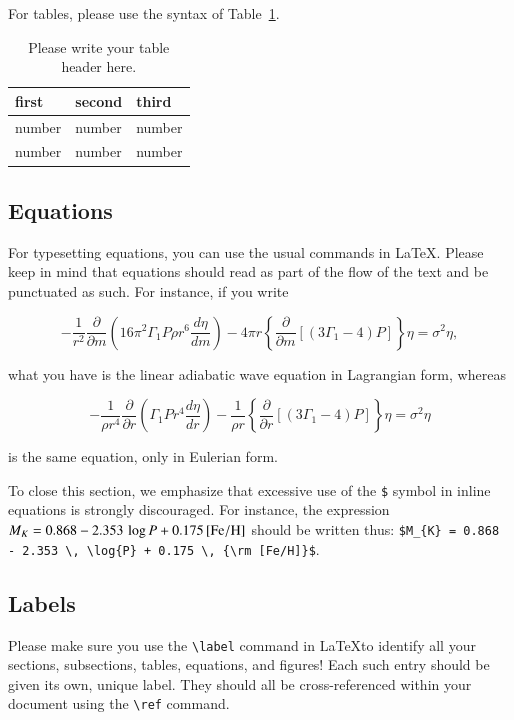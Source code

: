 \documentclass{webofc}
\begin{document}
For tables, please use the syntax of Table~\ref{tab:tab-1}.

\begin{table}
\centering
\caption{Please write your table header here.}
\begin{tabular}{lll}
\hline
first & second & third  \\\hline
number & number & number \\
number & number & number \\\hline
\end{tabular}
\label{tab:tab-1}       %
\end{table}
%

\subsection{Equations}\label{sec:eqs}
For typesetting equations, you can use the usual commands in \LaTeX. Please keep in mind that equations should read as part of the flow of the text and be punctuated as such. For instance, if you write 

\begin{equation}
- \frac{1}{r^2}
\frac{\partial}{\partial m}\left(16 \pi^2 \Gamma_1 P \rho r^6
\frac{d\eta}{dm}\right)
- 4\pi r \left\{\frac{\partial}{\partial m}\left[(3\Gamma_1-4)P \right]\right\} \eta = 
\sigma^2 \eta,  
\label{eq:lawe}
\end{equation}

\noindent what you have is the linear adiabatic wave equation in Lagrangian form, whereas 

\begin{equation}
- \frac{1}{\rho r^4}
\frac{\partial}{\partial r}\left(\Gamma_1 P r^4
\frac{d\eta}{dr}\right)
- \frac{1}{\rho r} \left\{\frac{\partial}{\partial r}\left[(3\Gamma_1-4)P \right]\right\} \eta = 
\sigma^2 \eta  
\label{eq:laweeuler}
\end{equation}

\noindent is the same equation, only in Eulerian form. 

To close this section, we emphasize that excessive use of the \lstinline!$! symbol in inline equations is strongly discouraged. For instance, the expression $M_{K} = 0.868 - 2.353 \, \log{P} + 0.175 \, {\rm [Fe/H]}$ should be written thus: \lstinline!$M_{K} = 0.868 - 2.353 \, \log{P} + 0.175 \, {\rm [Fe/H]}$!. 

\subsection{Labels}\label{sec:labels}
Please make sure you use the \lstinline!\label! command in \LaTeX to identify all your sections, subsections, tables, equations, and figures! Each such entry should be given its own, unique label. They should all be cross-referenced within your document using the \lstinline!\ref! command. 
\end{document}
